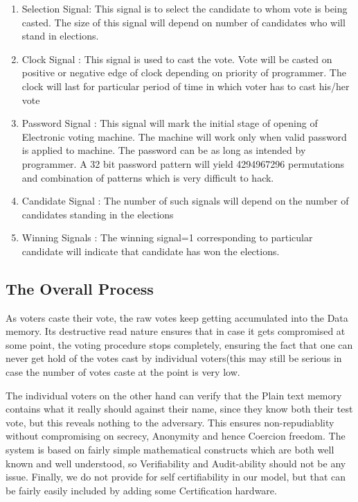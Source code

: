 \documentclass{article}
\begin{document}
\begin{enumerate}
\item Selection Signal: This signal is to select the candidate to whom vote is being casted. The size of this signal will depend on number of candidates who will stand in elections.
\item Clock Signal : This signal is used to cast the vote. Vote will be casted on positive or negative edge of
clock depending on priority of programmer. The clock will last for particular period of time in which voter has to cast
his/her vote
\item Password Signal : This signal will mark the initial stage of opening of Electronic voting machine. The machine will work only when valid password is applied to machine. The password can be as long as intended by programmer. A 32 bit password pattern will yield 4294967296 permutations and combination of patterns which is very difficult to hack.
\item Candidate Signal : The number of such signals will depend on the number of candidates standing in the elections
\item Winning Signals : The winning signal=1 corresponding to particular candidate will indicate that candidate has won the
elections.
\end{enumerate}

\subsection{The Overall Process}
As voters caste their vote, the raw votes keep getting accumulated into the Data memory. Its destructive read nature ensures that in case it gets compromised at some point, the voting procedure stops completely, ensuring the fact that one can never get hold of the votes cast by individual voters(this may still be serious in case the number of votes caste at the point is very low.

The individual voters on the other hand can verify that the Plain text memory contains what it really should against their name, since they know both their test vote, but this reveals nothing to the adversary. This ensures non-repudiablity without compromising on secrecy, Anonymity and hence Coercion freedom. The system is based on fairly simple mathematical constructs which are both well known and well understood, so Verifiability and Audit-ability should not be any issue. Finally, we do not provide for self certifiability in our model, but that can be fairly easily included by adding some Certification hardware.
\end{document}
